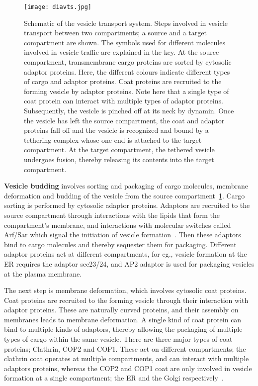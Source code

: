 \begin{figure}
	\texttt{[image: diavts.jpg]}
	\caption{Schematic of the vesicle transport system. Steps involved in vesicle transport between two compartments; a source and a target compartment are shown. 
	The symbols used for different molecules involved in vesicle traffic are explained in the key. At the source compartment, transmembrane cargo proteins are sorted by cytosolic adaptor proteins. 
	Here, the different colours indicate different types of cargo and adaptor proteins. Coat proteins are recruited to the forming vesicle by adaptor proteins. 
	Note here that a single type of coat protein can interact with multiple types of adaptor proteins. Subsequently, the vesicle is pinched off at its neck by dynamin. 
	Once the vesicle has left the source compartment, the coat and adaptor proteins fall off and the vesicle is recognized and bound by a tethering complex whose one end is attached to the target compartment. At the target compartment, the tethered vesicle undergoes fusion, thereby releasing its contents into the target compartment.}
    \label{fig:vts}
\end{figure}

\textbf{Vesicle budding} involves sorting and packaging of cargo molecules, membrane deformation and budding of the vesicle from the source compartment~\ref{fig:vts}.
%
Cargo sorting is performed by cytosolic adaptor proteins. 
Adaptors are recruited to the source compartment through interactions with the lipids that form the compartment's membrane, and interactions with molecular switches called Arf/Sar which signal the initiation of vesicle formation~\cite{paczkowski2015cargo}. Then these adaptors bind to cargo molecules and thereby sequester them for packaging. 
%
Different adaptor proteins act at different compartments, for eg., vesicle formation at the ER requires the adaptor sec23/24, and AP2 adaptor is used for packaging vesicles at the plasma membrane.
%

The next step is membrane deformation, which involves cytosolic coat proteins. Coat proteins are recruited to the forming vesicle through their interaction with adaptor proteins. These are naturally curved proteins, and their assembly on membranes leads to membrane deformation.
A single kind of coat protein can bind to multiple kinds of adaptors, thereby allowing the packaging of multiple types of cargo within the same vesicle. 
%
There are three major types of coat proteins; Clathrin, COP2 and COP1. These act on different compartments; the clathrin coat operates at multiple compartments, and can interact with multiple adaptors proteins, whereas the COP2 and COP1 coat are only involved in vesicle formation at a single compartment; the ER and the Golgi respectively~\cite{faini2013vesicle}.


